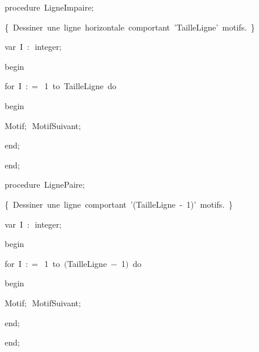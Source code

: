 {\pagebreak[3] 
\vspace{\neglskip}\mbox{\blc  \blk\idt  \mcl procedure\idt \ LigneImpaire$;$}\par 
\vspace{\neglskip}\mbox{\blc  \blk\blk\idt  \cmt  \{\ Dessiner\ une\ ligne\ horizontale\ comportant\ {'}TailleLigne{'}\ motifs.\ \}\idt }\par 
\pagebreak[3] 
\vspace{\neglskip}\mbox{\blc  \blk\blk\idt  \mcl var\idt \ I\ $:$\ integer$;$}\par 
\vspace{\neglskip}\mbox{\blc  \blk\idt  \mcl begin\idt }\par 
\pagebreak[3] 
\vspace{\neglskip}\mbox{\blc  \blk\blk\idt  \mcl for\idt \ I\ $:$$=$\ 1\ \mcl to\idt \ TailleLigne\ \mcl do\idt }\par 
\vspace{\neglskip}\mbox{\blc  \blk\blk\blk\idt  \mcl begin\idt }\par 
\vspace{\neglskip}\mbox{\blc  \blk\blk\blk\blk\idt  Motif$;$\ MotifSuivant$;$}\par 
\vspace{\neglskip}\mbox{\blc  \blk\blk\blk\idt  \mcl end\idt $;$}\par 
\vspace{\neglskip}\mbox{\blc  \blk\idt  \mcl end\idt $;$}\par 
\medskip

\pagebreak[3] 
\vspace{\neglskip}\mbox{\blc  \blk\idt  \mcl procedure\idt \ LignePaire$;$}\par 
\vspace{\neglskip}\mbox{\blc  \blk\blk\idt  \cmt  \{\ Dessiner\ une\ ligne\ comportant\ {'}(TailleLigne\ -\ 1){'}\ motifs.\ \}\idt }\par 
\pagebreak[3] 
\vspace{\neglskip}\mbox{\blc  \blk\blk\idt  \mcl var\idt \ I\ $:$\ integer$;$}\par 
\vspace{\neglskip}\mbox{\blc  \blk\idt  \mcl begin\idt }\par 
\pagebreak[3] 
\vspace{\neglskip}\mbox{\blc  \blk\blk\idt  \mcl for\idt \ I\ $:$$=$\ 1\ \mcl to\idt \ $($TailleLigne\ $-$\ 1$)$\ \mcl do\idt }\par 
\vspace{\neglskip}\mbox{\blc  \blk\blk\blk\idt  \mcl begin\idt }\par 
\vspace{\neglskip}\mbox{\blc  \blk\blk\blk\blk\idt  Motif$;$\ MotifSuivant$;$}\par 
\vspace{\neglskip}\mbox{\blc  \blk\blk\blk\idt  \mcl end\idt $;$}\par 
\vspace{\neglskip}\mbox{\blc  \blk\idt  \mcl end\idt $;$}\par 
\medskip

}
